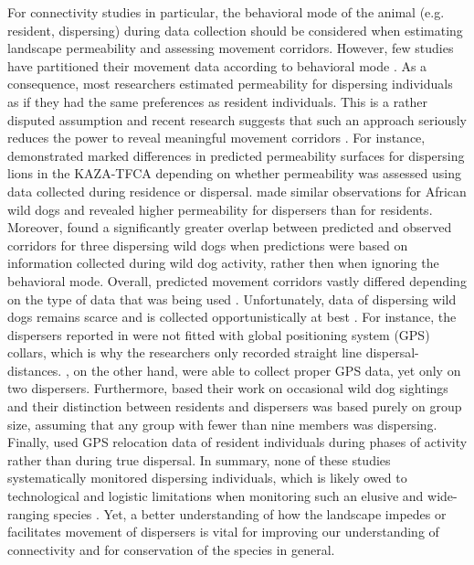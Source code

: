 \documentclass[abstract=on,10pt,a4paper,bibliography=totocnumbered]{scrartcl}
\begin{document}
For connectivity studies in particular, the behavioral mode of the animal (e.g.
resident, dispersing) during data collection should be considered when
estimating landscape permeability and assessing movement corridors. However, few
studies have partitioned their movement data according to behavioral mode
\citep{Wilson.2012, Vasudev.2015}. As a consequence, most researchers estimated
permeability for dispersing individuals as if they had the same preferences as
resident individuals. This is a rather disputed assumption and recent research
suggests that such an approach seriously reduces the power to reveal meaningful
movement corridors \citep{Killeen.2014}. For instance, \cite{Elliot.2014}
demonstrated marked differences in predicted permeability surfaces for
dispersing lions in the KAZA-TFCA depending on whether permeability was assessed
using data collected during residence or dispersal. \cite{Jackson.2016} made
similar observations for African wild dogs and revealed higher permeability for
dispersers than for residents. Moreover, \cite{Abrahms.2017} found a
significantly greater overlap between predicted and observed corridors for three
dispersing wild dogs when predictions were based on information collected during
wild dog activity, rather then when ignoring the behavioral mode. Overall,
predicted movement corridors vastly differed depending on the type of data that
was being used \citep{Elliot.2014, Jackson.2016, Abrahms.2017}. Unfortunately,
data of dispersing wild dogs remains scarce and is collected opportunistically
at best \citep{DaviesMostert.2012, Masenga.2016, Jackson.2016, Abrahms.2017}.
For instance, the dispersers reported in \cite{DaviesMostert.2012} were not
fitted with global positioning system (GPS) collars, which is why the
researchers only recorded straight line dispersal-distances.
\cite{Masenga.2016}, on the other hand, were able to collect proper GPS data,
yet only on two dispersers. Furthermore, \cite{Jackson.2016} based their work on
occasional wild dog sightings and their distinction between residents and
dispersers was based purely on group size, assuming that any group with fewer
than nine members was dispersing. Finally, \cite{Abrahms.2017} used GPS
relocation data of resident individuals during phases of activity rather than
during true dispersal. In summary, none of these studies systematically
monitored dispersing individuals, which is likely owed to technological and
logistic limitations when monitoring such an elusive and wide-ranging species
\citep{Nathan.2001, Tesson.2013}. Yet, a better understanding of how the
landscape impedes or facilitates movement of dispersers is vital for improving
our understanding of connectivity and for conservation of the species in
general.
\end{document}
